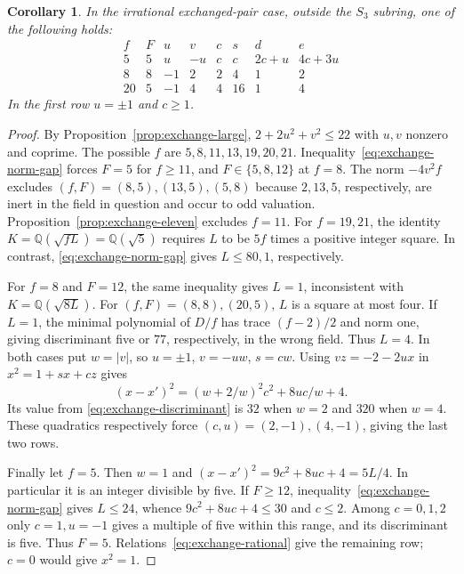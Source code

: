 \documentclass[11pt,a4paper]{article}
\newtheorem{corollary}[theorem]{Corollary}
\numberwithin{equation}{section}
\begin{document}
\begin{corollary}\label{cor:exchange-pointwise}
In the irrational exchanged-pair case, outside the $S_3$ subring, one of the following holds:
\[
\begin{array}{c|c|rrrrrr}
f&F&u&v&c&s&d&e\\\hline
5&5&u&-u&c&c&2c+u&4c+3u\\
8&8&-1&2&2&4&1&2\\
20&5&-1&4&4&16&1&4
\end{array}
\]
In the first row $u=\pm1$ and $c\ge1$.
\end{corollary}
\begin{proof}
By Proposition~\ref{prop:exchange-large}, $2+2u^2+v^2\le22$ with $u,v$ nonzero and coprime. The possible $f$ are $5,8,11,13,19,20,21$. Inequality~\eqref{eq:exchange-norm-gap} forces $F=5$ for $f\ge11$, and $F\in\{5,8,12\}$ at $f=8$. The norm $-4v^2f$ excludes $(f,F)=(8,5),(13,5),(5,8)$ because $2,13,5$, respectively, are inert in the field in question and occur to odd valuation. Proposition~\ref{prop:exchange-eleven} excludes $f=11$. For $f=19,21$, the identity $K=\mathbb Q(\sqrt{fL})=\mathbb Q(\sqrt5)$ requires $L$ to be $5f$ times a positive integer square. In contrast, \eqref{eq:exchange-norm-gap} gives $L\le80,1$, respectively.

For $f=8$ and $F=12$, the same inequality gives $L=1$, inconsistent with $K=\mathbb Q(\sqrt{8L})$. For $(f,F)=(8,8),(20,5)$, $L$ is a square at most four. If $L=1$, the minimal polynomial of $D/f$ has trace $(f-2)/2$ and norm one, giving discriminant five or $77$, respectively, in the wrong field. Thus $L=4$. In both cases put $w=|v|$, so $u=\pm1$, $v=-uw$, $s=cw$. Using $vz=-2-2ux$ in $x^2=1+sx+cz$ gives
\[
 (x-x')^2=(w+2/w)^2c^2+8uc/w+4.
\]
Its value from \eqref{eq:exchange-discriminant} is $32$ when $w=2$ and $320$ when $w=4$. These quadratics respectively force $(c,u)=(2,-1),(4,-1)$, giving the last two rows.

Finally let $f=5$. Then $w=1$ and $(x-x')^2=9c^2+8uc+4=5L/4$. In particular it is an integer divisible by five. If $F\ge12$, inequality~\eqref{eq:exchange-norm-gap} gives $L\le24$, whence $9c^2+8uc+4\le30$ and $c\le2$. Among $c=0,1,2$ only $c=1,u=-1$ gives a multiple of five within this range, and its discriminant is five. Thus $F=5$. Relations~\eqref{eq:exchange-rational} give the remaining row; $c=0$ would give $x^2=1$.
\end{proof}
\end{document}
